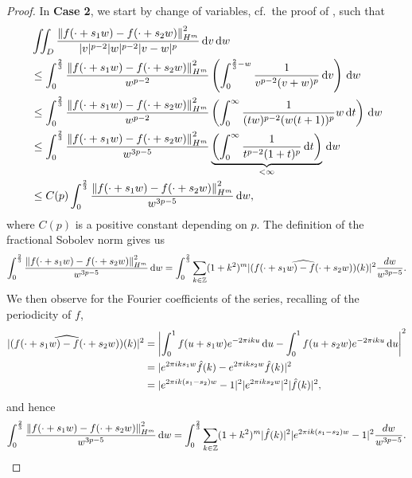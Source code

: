 \begin{proof}
	In \textbf{Case 2}, we start by change of variables, cf.\ the proof of \cite[Lemma 4.4]{BlattReiter:2015:Menger}, such that
	\begin{align}\label{eq:startcase2}
	& \iint_D   \frac{ \left\| f(\cdot+s_1w) - f(\cdot+s_2w) \right\|^2_{H^m}}{|v|^{p-2}|w|^{p-2}|v-w|^{p}}  \d v \d w \nonumber \\
	& \leq \int_{0}^{\frac 23}  \frac{ \left\| f(\cdot+s_1w) - f(\cdot+s_2w) \right\|^2_{H^m}}{w^{p-2}}  \left( \int_0^{\frac 23 - w} \frac{1}{v^{p-2}(v+w)^{p}} \d v \right) \d w \nonumber \\
	& \leq \int_{0}^{\frac 23}  \frac{ \left\| f(\cdot+s_1w) - f(\cdot+s_2w) \right\|^2_{H^m}}{w^{p-2}}  \left( \int_0^{\infty} \frac{1}{(tw)^{p-2}(w(t+1))^{p}} w \d t \right) \d w\nonumber\\
	& \leq \int_{0}^{\frac 23}  \frac{ \left\| f(\cdot+s_1w) - f(\cdot+s_2w) \right\|^2_{H^m}}{w^{3p-5}} \underbrace{ \left( \int_0^{\infty} \frac{1}{t^{p-2}(1+t)^{p}} \d t \right) }_{<\infty} \d w \nonumber \\
	& \leq C (p) \int_{0}^{\frac 23}  \frac{ \left\| f(\cdot+s_1w) - f(\cdot+s_2w) \right\|^2_{H^m}}{w^{3p-5}}  \d w, 
	\end{align}
	where $C(p)$ is a positive constant depending on $p$.
	The definition of the fractional Sobolev norm gives us 
	\begin{align*}
	\int_{0}^{\frac 23}  \frac{ \left\| f(\cdot+s_1w) - f(\cdot+s_2w) \right\|^2_{H^m}}{w^{3p-5}}  \,\mathrm{d} w = \int_{0}^{\frac 23} \sum_{k\in\mathbb{Z}} (1+k^2)^m  |(\widehat{f(\cdot+s_1w) - f(\cdot+s_2w)})(k)|^2  \frac{dw}{w^{3p-5}}.
	\end{align*}
	We then observe for the Fourier coefficients of the series, recalling of the periodicity of $f$,
	\begin{align*}
	|(\widehat{f(\cdot+s_1w) - f(\cdot+s_2w)})(k)|^2 & =  \left|\int_0^1 f(u+s_1w) e^{-2\pi i k u}\,\mathrm{d} u - \int_0^1  f(u+s_2w)e^{-2\pi i k u}\,\mathrm{d} u\right|^2 \\
	& =  |e^{2\pi i k s_1 w} \hat{f}(k) - e^{2\pi i k s_2 w} \hat{f}(k)|^2 \\
	& = |e^{2\pi i k (s_1 -s_2)w}-1|^2 |e^{2\pi i k s_2 w}|^2 |\hat{f}(k)|^2, 
	\end{align*}
	and hence 
	\begin{align*}
	\int_{0}^{\frac 23}  \frac{ \left\| f(\cdot+s_1w) - f(\cdot+s_2w) \right\|^2_{H^m}}{w^{3p-5}}  \,\mathrm{d} w = \int_{0}^{\frac 23} \sum_{k\in\mathbb{Z}} (1+k^2)^m |\hat{f}(k)|^2   |e^{2\pi i k (s_1 -s_2)w}-1|^2 \frac{dw}{w^{3p-5}}.
	\end{align*}

\end{proof}

